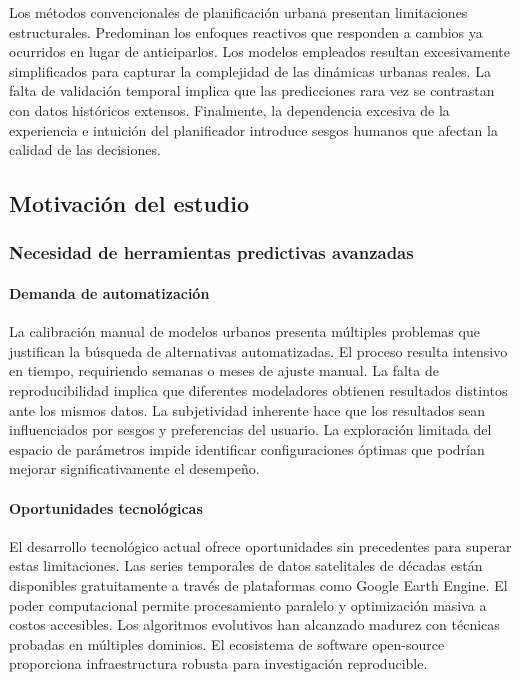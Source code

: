 Los métodos convencionales de planificación urbana presentan limitaciones estructurales. Predominan los enfoques reactivos que responden a cambios ya ocurridos en lugar de anticiparlos. Los modelos empleados resultan excesivamente simplificados para capturar la complejidad de las dinámicas urbanas reales. La falta de validación temporal implica que las predicciones rara vez se contrastan con datos históricos extensos. Finalmente, la dependencia excesiva de la experiencia e intuición del planificador introduce sesgos humanos que afectan la calidad de las decisiones.

\subsection{Motivación del estudio}

\subsubsection{Necesidad de herramientas predictivas avanzadas}

\paragraph{Demanda de automatización}

La calibración manual de modelos urbanos presenta múltiples problemas que justifican la búsqueda de alternativas automatizadas. El proceso resulta intensivo en tiempo, requiriendo semanas o meses de ajuste manual. La falta de reproducibilidad implica que diferentes modeladores obtienen resultados distintos ante los mismos datos. La subjetividad inherente hace que los resultados sean influenciados por sesgos y preferencias del usuario. La exploración limitada del espacio de parámetros impide identificar configuraciones óptimas que podrían mejorar significativamente el desempeño.

\paragraph{Oportunidades tecnológicas}

El desarrollo tecnológico actual ofrece oportunidades sin precedentes para superar estas limitaciones. Las series temporales de datos satelitales de décadas están disponibles gratuitamente a través de plataformas como Google Earth Engine. El poder computacional permite procesamiento paralelo y optimización masiva a costos accesibles. Los algoritmos evolutivos han alcanzado madurez con técnicas probadas en múltiples dominios. El ecosistema de software open-source proporciona infraestructura robusta para investigación reproducible.

